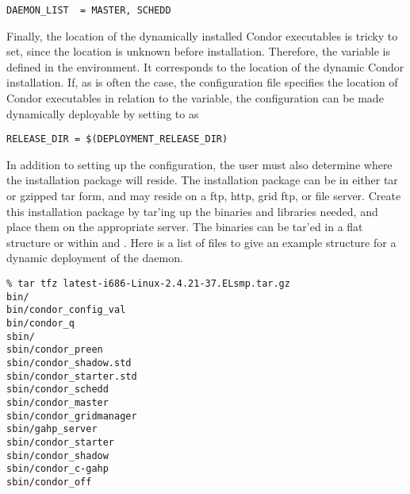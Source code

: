 \footnotesize
\begin{verbatim}
DAEMON_LIST  = MASTER, SCHEDD
\end{verbatim}
\normalsize

Finally, the location
of the dynamically installed Condor executables is tricky to set,
since the location is unknown before installation.
Therefore,
the variable  is defined in the environment.
It corresponds to the location of the dynamic Condor installation.
If, as is often the case, 
the configuration file specifies the location of Condor executables in
relation to the  variable, the configuration can
be made dynamically deployable by setting  to
 as 

\footnotesize
\begin{verbatim}
RELEASE_DIR = $(DEPLOYMENT_RELEASE_DIR)
\end{verbatim}
\normalsize

In addition to setting up the configuration, the user must also
determine where the installation package will reside.
The installation package can be in either tar or 
gzipped tar form, and may
reside on a ftp, http, grid ftp, or file server.  
Create this installation package by tar'ing up the binaries and libraries
needed, and place them on the appropriate server.
The binaries can be tar'ed in a flat structure or within  and
.  Here is a list of files to give an example
structure for a dynamic deployment of the  daemon.

\footnotesize
\begin{verbatim}
% tar tfz latest-i686-Linux-2.4.21-37.ELsmp.tar.gz
bin/
bin/condor_config_val
bin/condor_q
sbin/
sbin/condor_preen
sbin/condor_shadow.std
sbin/condor_starter.std
sbin/condor_schedd
sbin/condor_master
sbin/condor_gridmanager
sbin/gahp_server
sbin/condor_starter
sbin/condor_shadow
sbin/condor_c-gahp
sbin/condor_off 
\end{verbatim}
\normalsize
